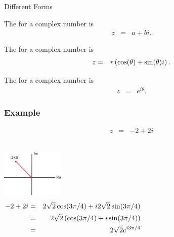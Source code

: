 \begin{frame}{Different Forms}

  \begin{definition}
    The  for a complex number is 
    \begin{eqnarray*}
      z & = & a + bi.
    \end{eqnarray*}
  \end{definition}

  \begin{definition}
    The  for a complex number is 
    \begin{eqnarray*}
      z & = & r\left( \cos(\theta) + \sin(\theta) i \right).
    \end{eqnarray*}
  \end{definition}

  \begin{definition}
    The  for a complex number is 
    \begin{eqnarray*}
      z & = & e^{i\theta}.
    \end{eqnarray*}
  \end{definition}

  
\end{frame}


\begin{frame}
  \frametitle{Example}

  \begin{eqnarray*}
    z & = & -2 + 2i \\
  \end{eqnarray*}

  \begin{columns}
    {
      \includegraphics[width=8em]{img/complexQuadTwo}
    } 
     {%
      \begin{eqnarray*}
        -2 + 2i & = & 2\sqrt{2} \cos(3\pi/4) + i 2\sqrt{2} \sin(3\pi/4) \\
        & = & 2\sqrt{2} \left( \cos(3\pi/4) + i\sin(3\pi/4) \right) \\
        & = & 2\sqrt{2} e^{i3\pi/4}
      \end{eqnarray*}
    }
  \end{columns}
\end{frame}

